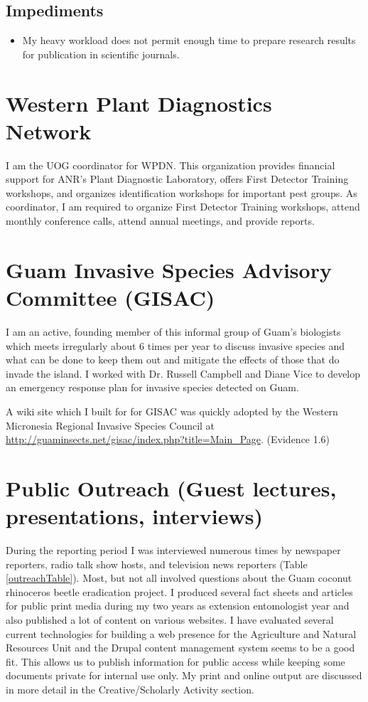 \documentclass[12pt,oneside,english]{scrbook}
\begin{document}
\subsection{Impediments}
\begin{itemize}
\item My heavy workload does not permit enough time to prepare research
results for publication in scientific journals.
\end{itemize}

\section{Western Plant Diagnostics Network}

I am the UOG coordinator for WPDN. This organization provides financial
support for ANR's Plant Diagnostic Laboratory, offers First Detector
Training workshops, and organizes identification workshops for important
pest groups. As coordinator, I am required to organize First Detector
Training workshops, attend monthly conference calls, attend annual
meetings, and provide reports.

\section{Guam Invasive Species Advisory Committee (GISAC)}

I am an active, founding member of this informal group of Guam's biologists
which meets irregularly about 6 times per year to discuss invasive
species and what can be done to keep them out and mitigate the effects
of those that do invade the island. I worked with Dr. Russell Campbell
and Diane Vice to develop an emergency response plan for invasive
species detected on Guam.

A wiki site which I built for for GISAC was quickly adopted by the
Western Micronesia Regional Invasive Species Council at \url{http://guaminsects.net/gisac/index.php?title=Main_Page}.
(Evidence 1.6)

\section{Public Outreach (Guest lectures, presentations, interviews)}

During the reporting period I was interviewed numerous times by newspaper
reporters, radio talk show hosts, and television news reporters (Table
\ref{outreachTable}). Most, but not all involved questions about
the Guam coconut rhinoceros beetle eradication project. I produced
several fact sheets and articles for public print media during my
two years as extension entomologist year and also published a lot
of content on various websites. I have evaluated several current technologies
for building a web presence for the Agriculture and Natural Resources
Unit and the Drupal content management system seems to be a good fit.
This allows us to publish information for public access while keeping
some documents private for internal use only. My print and online
output are discussed in more detail in the Creative/Scholarly Activity
section. 
\end{document}
